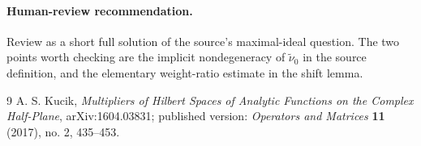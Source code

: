 \documentclass[11pt]{article}
\begin{document}
\paragraph{Human-review recommendation.}
Review as a short full solution of the source's maximal-ideal question.  The
two points worth checking are the implicit nondegeneracy of \(\widetilde\nu_0\)
in the source definition, and the elementary weight-ratio estimate in the
shift lemma.

\begin{thebibliography}{9}
A. S. Kucik,
\emph{Multipliers of Hilbert Spaces of Analytic Functions on the Complex
Half-Plane},
arXiv:1604.03831; published version: \emph{Operators and Matrices}
\textbf{11} (2017), no. 2, 435--453.
\end{thebibliography}
\end{document}
